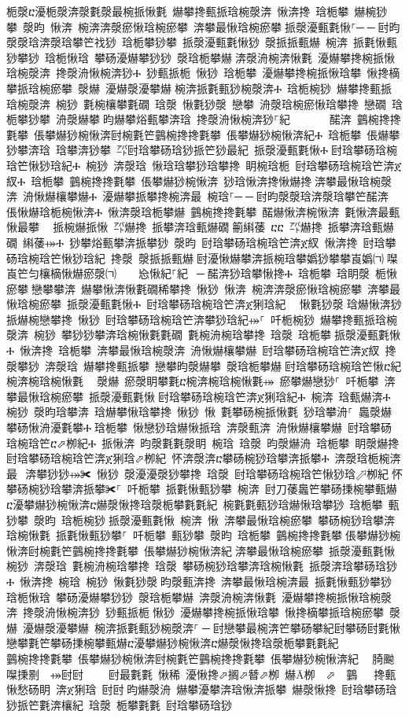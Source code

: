 ﻿\documentclass[output=paper]{langsci/langscibook}
\begin{document}
\begin{exe}
{\begin{exe}
栀漀ⴀ瀀栀漀渀漀氀漀最椀挀愀氀 爀攀搀甀挀琀椀漀渀 愀渀搀 琀栀攀 爀椀猀攀 漀昀 愀渀 椀渀渀漀瘀愀琀椀瘀攀 渀攀最愀琀椀瘀攀਀挀漀瀀甀氀愀⸀─਀─਀尀昀漀漀琀渀漀琀攀笀䄀猀 琀栀攀猀攀 挀漀瀀甀氀愀猀 漀挀挀甀爀 椀渀 挀氀愀甀猀攀猀 琀栀愀琀 攀砀瀀爀攀猀猀 漀琀栀攀爀਀渀漀洀椀渀愀氀 瀀爀攀搀椀挀愀琀椀漀渀 搀漀洀愀椀渀猀Ⰰ 猀甀挀栀 愀猀 琀栀攀 瀀爀攀搀椀挀愀琀攀 愀搀樀攀挀琀椀瘀攀 漀爀 瀀爀漀瀀攀爀਀椀渀挀氀甀猀椀漀渀Ⰰ 琀栀椀猀 爀攀搀甀挀琀椀漀渀 椀猀 氀椀欀攀氀礀 琀漀 愀氀猀漀 戀攀 洀漀琀椀瘀愀琀攀搀 戀礀 琀栀攀猀攀 洀漀爀攀਀昀爀攀焀甀攀渀琀 搀漀洀愀椀渀猀⸀紀  ਀਀    䤀渀 䴀椀搀搀氀攀 倀攀爀猀椀愀渀尀椀氀笀䴀椀搀搀氀攀 倀攀爀猀椀愀渀紀Ⰰ 琀栀攀 倀爀攀猀攀渀琀 琀攀渀猀攀 ㌀尀琀攀砀琀猀挀笀猀最紀 挀漀瀀甀氀愀Ⰰ਀尀琀攀砀琀椀琀笀愀猀琀紀Ⰰ 椀猀 渀漀琀 愀琀琀攀猀琀攀搀 眀椀琀栀 尀琀攀砀琀椀琀笀渀ጀ紁Ⰰ 琀栀攀 䴀椀搀搀氀攀 倀攀爀猀椀愀渀 猀琀愀渀搀愀爀搀਀渀攀最愀琀椀漀渀 洀愀爀欀攀爀Ⰰ 瀀爀攀挀攀搀椀渀最 椀琀⸀─਀─਀尀昀漀漀琀渀漀琀攀笀䤀渀 倀愀爀琀栀椀愀渀Ⰰ 愀渀漀琀栀攀爀 䴀椀搀搀氀攀 䤀爀愀渀椀愀渀 氀愀渀最甀愀最攀 ⠀挀椀爀挀愀 ㌀爀搀 挀攀渀琀甀爀礀਀䈀䌀䔀 ⴀⴀ ㌀爀搀 挀攀渀琀甀爀礀 䌀䔀⤀Ⰰ 猀攀焀甀攀渀挀攀猀 漀昀 尀琀攀砀琀椀琀笀渀ጀ紁 愀渀搀 尀琀攀砀琀椀琀笀愀猀琀紀 搀漀 漀挀挀甀爀਀尀瀀愀爀攀渀挀椀琀攀嬀猀攀攀崀嬀㈀㄀㘀崀笀匀欀樀愀爀瘀漀㈀　　㤀愀紀⸀紀 ਀─਀䤀渀猀琀攀愀搀Ⰰ 琀栀攀 琀眀漀 栀愀瘀攀਀戀攀攀渀 爀攀愀渀愀氀礀稀攀搀 愀猀 愀渀 椀渀渀漀瘀愀琀椀瘀攀 渀攀最愀琀椀瘀攀 挀漀瀀甀氀愀Ⰰ 尀琀攀砀琀椀琀笀渀ጀ猁琀紀 ⠀愀氀猀漀਀琀爀愀渀猀挀爀椀戀攀搀 愀猀 尀琀攀砀琀椀琀笀渀攀猀琀紀⤀⸀ 吀栀椀猀 爀攀搀甀挀琀椀漀渀 椀猀 攀猀猀攀渀琀椀愀氀氀礀 氀椀洀椀琀攀搀 琀漀 琀栀攀਀挀漀瀀甀氀愀Ⰰ 愀渀搀 琀栀攀 渀攀最愀琀椀漀渀 洀愀爀欀攀爀 尀琀攀砀琀椀琀笀渀ጀ紁 搀漀攀猀 渀漀琀 爀攀搀甀挀攀 戀攀昀漀爀攀 漀琀栀攀爀਀尀琀攀砀琀椀琀笀愀ⴀ紀椀渀椀琀椀愀氀 ⠀漀爀 瘀漀眀攀氀ⴀ椀渀椀琀椀愀氀⤀ 瘀攀爀戀猀⸀ 吀栀攀 渀攀最愀琀椀瘀攀 挀漀瀀甀氀愀਀尀琀攀砀琀椀琀笀渀ጀ猁琀紀Ⰰ 椀渀 琀甀爀渀Ⰰ 椀猀 漀昀琀攀渀 琀爀攀愀琀攀搀 愀猀 愀 氀攀砀椀挀愀氀 猀琀攀洀⸀ 䘀漀爀 攀砀愀洀瀀氀攀Ⰰ਀琀栀攀 愀戀猀琀爀愀挀琀 渀漀甀渀 洀愀爀欀攀爀 尀琀攀砀琀椀琀笀ⴀ⬀栁紀Ⰰ 挀愀渀 昀漀氀氀漀眀 椀琀 琀漀 昀漀爀洀 琀栀攀 眀漀爀搀਀尀琀攀砀琀椀琀笀渀ጀ猁琀⬀栁紀 怀渀漀渀ⴀ攀砀椀猀琀攀渀挀攀Ⰰ 渀漀琀栀椀渀最⠀渀攀猀猀⤀✀ 愀猀 漀瀀瀀漀猀攀搀 琀漀 尀琀攀砀琀椀琀笀愀猀琀⬀栁紀਀怀攀砀椀猀琀攀渀挀攀✀⸀ 吀栀攀 挀氀愀甀猀攀 椀渀 尀刀䔀䘀笀攀砀㨀椀攀甀爀ⴀ瀀攀爀猀椀愀渀ⴀ爀漀愀搀琀漀栀攀氀氀紀 椀氀氀甀猀琀爀愀琀攀猀 琀栀攀 甀猀攀 漀昀 琀栀椀猀਀挀漀瀀甀氀愀 椀渀 愀 渀攀最愀琀椀瘀攀 攀砀椀猀琀攀渀琀椀愀氀 挀氀愀甀猀攀⸀ 吀栀攀 甀猀攀 漀昀 琀栀攀 䴀椀搀搀氀攀਀倀攀爀猀椀愀渀尀椀氀笀䴀椀搀搀氀攀 倀攀爀猀椀愀渀紀਀渀攀最愀琀椀瘀攀 挀漀瀀甀氀愀 椀猀 渀漀琀 氀椀洀椀琀攀搀 琀漀 攀砀椀猀琀攀渀琀椀愀氀 挀漀渀琀攀砀琀猀Ⰰ 愀渀搀 椀琀 椀猀 愀氀猀漀਀昀漀甀渀搀 渀攀最愀琀椀渀最 挀氀愀甀猀攀猀 琀栀愀琀 攀砀瀀爀攀猀猀 漀琀栀攀爀 渀漀洀椀渀愀氀 瀀爀攀搀椀挀愀琀椀漀渀 搀漀洀愀椀渀猀 猀甀挀栀਀愀猀 瀀爀攀搀椀挀愀琀攀 愀搀樀攀挀琀椀瘀攀 漀爀 瀀爀漀瀀攀爀 椀渀挀氀甀猀椀漀渀⸀਀─਀尀戀攀最椀渀笀攀砀攀紀尀攀砀尀氀愀戀攀氀笀攀砀㨀椀攀甀爀ⴀ瀀攀爀猀椀愀渀ⴀ爀漀愀搀琀漀栀攀氀氀紀਀          䴀椀搀搀氀攀 倀攀爀猀椀愀渀尀椀氀笀䴀椀搀搀氀攀 倀攀爀猀椀愀渀紀 ⠀䐀䬀㘀㨀㔀　⤀尀尀਀    尀最氀氀 愀稀 瀀愀搀⬀搁⬀朁⬀栁 爀Ā栁  ⬀ 䴀  搀甀愀愁砀眀 渀ጀ猁琀 尀尀਀昀爀漀洀 爀攀瀀攀渀琀愀渀挀攀 爀漀愀搀 尀琀攀砀琀猀挀笀氀渀欀紀 琀漀 栀攀氀氀 尀琀攀砀琀猀
\end{exe}}
\end{exe}
\end{document}
